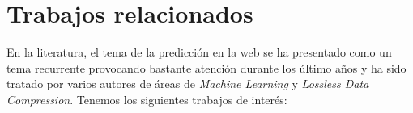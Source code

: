 \section{Trabajos relacionados}

En la literatura, el tema de la predicción en la web se ha presentado como un tema recurrente provocando bastante atención durante los último años y ha sido tratado por varios autores de áreas de \emph{Machine Learning} y \emph{Lossless Data Compression}. Tenemos los siguientes trabajos de interés:





